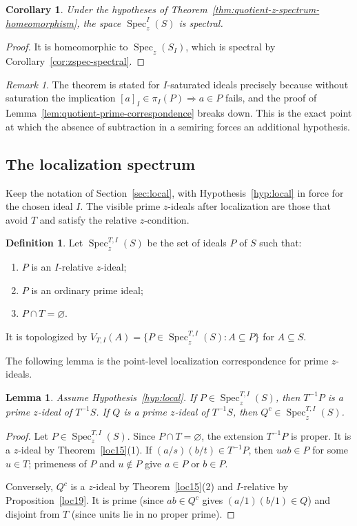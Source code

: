 \documentclass[11pt,leqno]{amsart}
\theoremstyle{plain}
\newtheorem{lemma}[theorem]{Lemma}
\newtheorem{corollary}[theorem]{Corollary}
\theoremstyle{definition}
\newtheorem{definition}{Definition}[section]
\theoremstyle{remark}
\newtheorem{remark}[theorem]{Remark}
\numberwithin{equation}{section}
\DeclareMathOperator{\Spec}{Spec}
\begin{document}
\begin{corollary}\label{cor:quotient-z-spectrum-spectral}
Under the hypotheses of Theorem~\ref{thm:quotient-z-spectrum-homeomorphism},
the space $\Spec_z^I(S)$ is spectral.
\end{corollary}
\begin{proof}
It is homeomorphic to $\Spec_z(S_I)$, which is spectral by
Corollary~\ref{cor:zspec-spectral}.
\end{proof}

\begin{remark}\label{rem:quotient-topological-hypotheses}
The theorem is stated for $I$-saturated ideals precisely because
without saturation the implication $[a]_I\in\pi_I(P)\Rightarrow a\in P$
fails, and the proof of Lemma~\ref{lem:quotient-prime-correspondence}
breaks down.
This is the exact point at which the absence of subtraction in
a semiring forces an additional hypothesis.
\end{remark}

\subsection{The localization spectrum}

Keep the notation of Section~\ref{sec:local}, with
Hypothesis~\ref{hyp:local} in force for the chosen ideal $I$.
The visible prime $z$-ideals after localization are those that
avoid $T$ and satisfy the relative $z$-condition.

\begin{definition}\label{def:localized-relative-spectrum}
Let $\Spec_z^{T,I}(S)$ be the set of ideals $P$ of $S$ such that:
\begin{enumerate}[label=\textup{(L\arabic*)}]
\item $P$ is an $I$-relative $z$-ideal;
\item $P$ is an ordinary prime ideal;
\item $P\cap T=\varnothing$.
\end{enumerate}
It is topologized by
$V_{T,I}(A)=\{P\in\Spec_z^{T,I}(S):A\subseteq P\}$ for $A\subseteq S$.
\end{definition}

The following lemma is the point-level localization correspondence
for prime $z$-ideals.

\begin{lemma}\label{lem:local-prime-correspondence}
Assume Hypothesis~\ref{hyp:local}.
If $P\in\Spec_z^{T,I}(S)$, then $T^{-1}P$ is a prime $z$-ideal
of $T^{-1}S$.
If $Q$ is a prime $z$-ideal of $T^{-1}S$, then $Q^c\in\Spec_z^{T,I}(S)$.
\end{lemma}
\begin{proof}
Let $P\in\Spec_z^{T,I}(S)$.
Since $P\cap T=\varnothing$, the extension $T^{-1}P$ is proper.
It is a $z$-ideal by Theorem~\ref{loc15}(1).
If $(a/s)(b/t)\in T^{-1}P$, then $uab\in P$ for some $u\in T$;
primeness of $P$ and $u\notin P$ give $a\in P$ or $b\in P$.

Conversely, $Q^c$ is a $z$-ideal by Theorem~\ref{loc15}(2)
and $I$-relative by Proposition~\ref{loc19}.
It is prime (since $ab\in Q^c$ gives $(a/1)(b/1)\in Q$)
and disjoint from $T$ (since units lie in no proper prime).
\end{proof}
\end{document}
